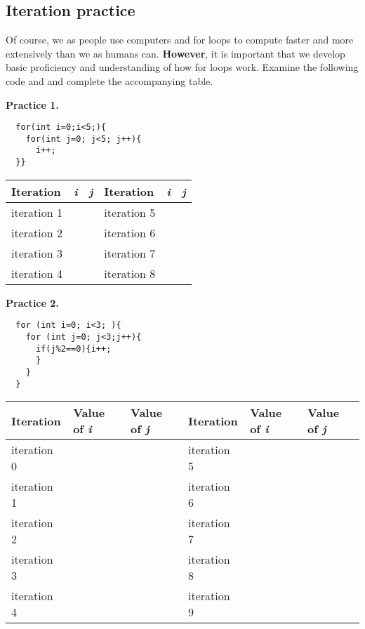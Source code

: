 \documentclass{article}
\begin{document}
\begin{flushleft}

\newpage

\subsection{Iteration practice}

Of course, we as people use computers and for loops to compute faster and more extensively than we as humans can. \textbf{However}, it is important that we develop basic proficiency and understanding of how for loops work.
Examine the following code and and complete the accompanying table.\par

\textbf{Practice 1.}\\

\begin{verbatim}
  for(int i=0;i<5;){
    for(int j=0; j<5; j++){
      i++;
  }}
\end{verbatim}

\begin{longtabu} to 120mm { | X[l] | X[c] |  X[c] | X[l] |  X[c] |  X[c] |}
  \hline
  \textbf{Iteration}  & \textbf{ \emph{i}} &  \textbf{ \emph{j}} &\textbf{Iteration}  & \textbf{ \emph{i}} &  \textbf{ \emph{j}} \\

 \hline
 iteration 1 &  &  & iteration 5 &  &  \\ 
 \hline
 iteration 2 &  &  & iteration 6 &  &  \\ 
 \hline
iteration 3 &  &  & iteration 7 &  &  \\ 
\hline
iteration 4 &  &  & iteration 8 &  &  \\ 
\hline
\end{longtabu}


\noindent \textbf{Practice 2.}\\
\begin{verbatim}
  for (int i=0; i<3; ){
    for (int j=0; j<3;j++){
      if(j%2==0){i++;
      }
    }
  }
\end{verbatim}
\begin{tabu} to 80mm { | X[l] | X[c] | | X[l] | X[c] | }
  \hline
  \textbf{Iteration}  & \textbf{Value of \emph{i}} & \textbf{Value of \emph{j}} &\textbf{Iteration}  & \textbf{Value of \emph{i}}  & \textbf{Value of \emph{j}} \\
  \hline
  iteration 0  & \ & \ & iteration 5  & \ & \  \\
  \hline
  iteration 1 &  \ & \ & iteration 6  & \ & \ \\
  \hline
  iteration 2 &   \ &  \ & iteration 7  & \ & \ \\
  \hline
  iteration 3 &  \ & \ & iteration 8  & \ & \ \\
  \hline
  iteration 4 &  \  & \ & iteration 9  & \ & \ \\
  \hline
  \hline
\end{tabu}



\end{flushleft}
\end{document}
